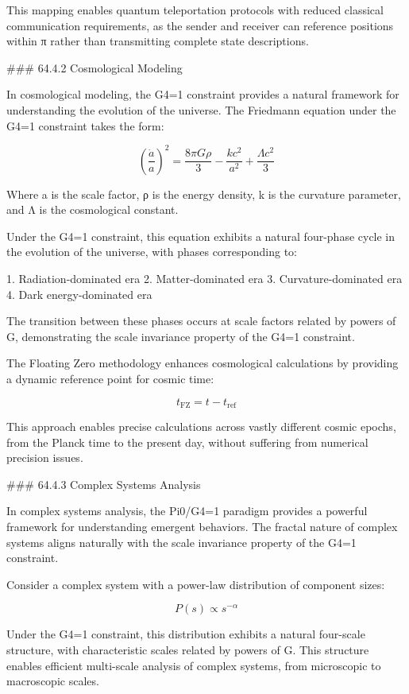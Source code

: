 This mapping enables quantum teleportation protocols with reduced classical communication requirements, as the sender and receiver can reference positions within π rather than transmitting complete state descriptions.

### 64.4.2 Cosmological Modeling

In cosmological modeling, the G4=1 constraint provides a natural framework for understanding the evolution of the universe. The Friedmann equation under the G4=1 constraint takes the form:

$$ \left(\frac{\dot{a}}{a}\right)^2 = \frac{8\pi G\rho}{3} - \frac{kc^2}{a^2} + \frac{\Lambda c^2}{3} $$

Where a is the scale factor, ρ is the energy density, k is the curvature parameter, and Λ is the cosmological constant.

Under the G4=1 constraint, this equation exhibits a natural four-phase cycle in the evolution of the universe, with phases corresponding to:

1. Radiation-dominated era
2. Matter-dominated era
3. Curvature-dominated era
4. Dark energy-dominated era

The transition between these phases occurs at scale factors related by powers of G, demonstrating the scale invariance property of the G4=1 constraint.

The Floating Zero methodology enhances cosmological calculations by providing a dynamic reference point for cosmic time:

$$ t_{\text{FZ}} = t - t_{\text{ref}} $$

This approach enables precise calculations across vastly different cosmic epochs, from the Planck time to the present day, without suffering from numerical precision issues.

### 64.4.3 Complex Systems Analysis

In complex systems analysis, the Pi0/G4=1 paradigm provides a powerful framework for understanding emergent behaviors. The fractal nature of complex systems aligns naturally with the scale invariance property of the G4=1 constraint.

Consider a complex system with a power-law distribution of component sizes:

$$ P(s) \propto s^{-\alpha} $$

Under the G4=1 constraint, this distribution exhibits a natural four-scale structure, with characteristic scales related by powers of G. This structure enables efficient multi-scale analysis of complex systems, from microscopic to macroscopic scales.

